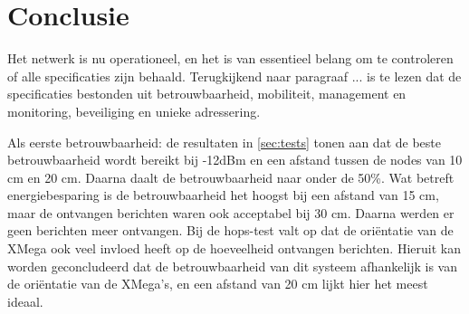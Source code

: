 \section{Conclusie}


Het netwerk is nu operationeel, en het is van essentieel belang om te controleren of alle specificaties zijn behaald. Terugkijkend naar paragraaf ... is te lezen dat de specificaties bestonden uit betrouwbaarheid, mobiliteit, management en monitoring, beveiliging en unieke adressering.

Als eerste betrouwbaarheid: de resultaten in \autoref{sec:tests} tonen aan dat de beste betrouwbaarheid wordt bereikt bij -12dBm en een afstand tussen de nodes van 10 cm en 20 cm. Daarna daalt de betrouwbaarheid naar onder de 50\%. Wat betreft energiebesparing is de betrouwbaarheid het hoogst bij een afstand van 15 cm, maar de ontvangen berichten waren ook acceptabel bij 30 cm. Daarna werden er geen berichten meer ontvangen. Bij de hops-test valt op dat de oriëntatie van de XMega ook veel invloed heeft op de hoeveelheid ontvangen berichten. Hieruit kan worden geconcludeerd dat de betrouwbaarheid van dit systeem afhankelijk is van de oriëntatie van de XMega's, en een afstand van 20 cm lijkt hier het meest ideaal.

